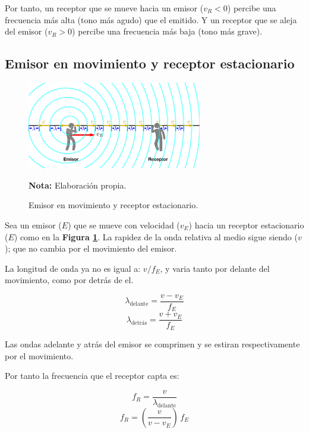 \documentclass[letter,11pt]{article}
\newcommand{\source}[1]{\vspace{-11pt} \caption*{\small{\textbf{Nota:} {#1}}}}
\begin{document}
Por tanto, un receptor que se mueve hacia un emisor ($v_R < 0$) percibe una
frecuencia más alta (tono más agudo) que el emitido. Y un receptor que se aleja
del emisor ($v_R > 0$) percibe una frecuencia más baja (tono más grave).

\subsection{Emisor en movimiento y receptor estacionario}

\begin{figure}
\centering
\includegraphics[width=0.68\textwidth]{resources/f3.eps}
\caption{Emisor en movimiento y receptor estacionario.}
\label{figura3}
\source{Elaboración propia.}
\end{figure}

Sea un emisor ($E$) que se mueve con velocidad ($v_E$) hacia un receptor
estacionario ($E$) como en la \textbf{Figura \ref{figura3}}. La rapidez de la
onda relativa al medio sigue siendo ($v$); que no cambia por el movimiento del
emisor.

La longitud de onda ya no es igual a: $v/f_E$, y varia tanto por delante del
movimiento, como por detrás de el.

\begin{equation*}
    \lambda_{\text{delante}} = \frac{v - v_E}{f_E}
\end{equation*}
\begin{equation*}
    \lambda_{\text{detrás}} = \frac{v + v_E}{f_E}
\end{equation*}
\vspace{0.10cm}

Las ondas adelante y atrás del emisor se comprimen y se estiran respectivamente
por el movimiento.

Por tanto la frecuencia que el receptor capta es:

\begin{equation*}
    f_R = \frac{v}{\lambda_{\text{delante}}}
\end{equation*}
\begin{equation}
    f_R = \left(\frac{v}{v - v_E}\right)\,f_E
\end{equation}
\vspace{0.10cm}
\end{document}
